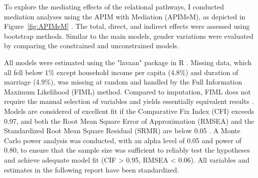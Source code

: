 To explore the mediating effects of the relational pathways, I conducted mediation analyses using the APIM with Mediation (APIMeM), as depicted in Figure~\ref{fig:APIMeM} \parencite{ledermannAssessingMediationDyadic2011}. The total, direct, and indirect effects were assessed using bootstrap methods. Similar to the main models, gender variations were evaluated by comparing the constrained and unconstrained models.

All models were estimated using the "lavaan" package in R \parencite{rosseelLavaanPackageStructural2012}. Missing data, which all fell below 1\% except household income per capita (4.8\%) and duration of marriage (4.9\%), was missing at random and handled by the Full Information Maximum Likelihood (FIML) method. Compared to imputation, FIML does not require the manual selection of variables and yields essentially equivalent results \parencite{leeComparisonFullInformation2021}. Models are considered of excellent fit if the Comparative Fix Index (CFI) exceeds 0.97, and both the Root Mean Square Error of Approximation (RMSEA) and the Standardized Root Mean Square Residual (SRMR) are below 0.05 \parencite{schermelleh-engelEvaluatingFitStructural2003}. A Monte Carlo power analysis was conducted, with an alpha level of 0.05 and power of 0.80, to ensure that the sample size was sufficient to reliably test the hypotheses and achieve adequate model fit (CIF > 0.95, RMSEA < 0.06). All variables and estimates in the following report have been standardized.
